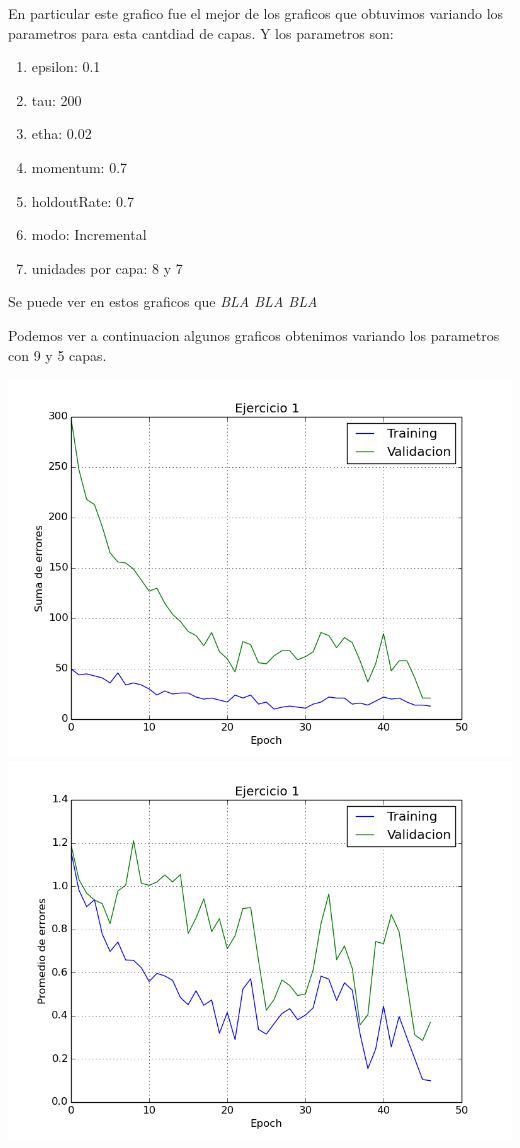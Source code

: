 En particular este grafico fue el mejor de los graficos que obtuvimos variando los parametros para esta cantdiad de capas. Y los parametros son:
\begin{enumerate}
\item epsilon: 0.1
\item tau: 200
\item etha: 0.02
\item momentum: 0.7
\item holdoutRate: 0.7
\item modo: Incremental
\item unidades por capa: 8 y 7
\end{enumerate}

Se puede ver en estos graficos que \emph{\color{red} BLA BLA BLA}

Podemos ver a continuacion algunos graficos obtenimos variando los parametros con 9 y 5 capas.


\includegraphics[scale=0.4]{img/ej100505195sum}
\includegraphics[scale=0.4]{img/ej100505195mean}


